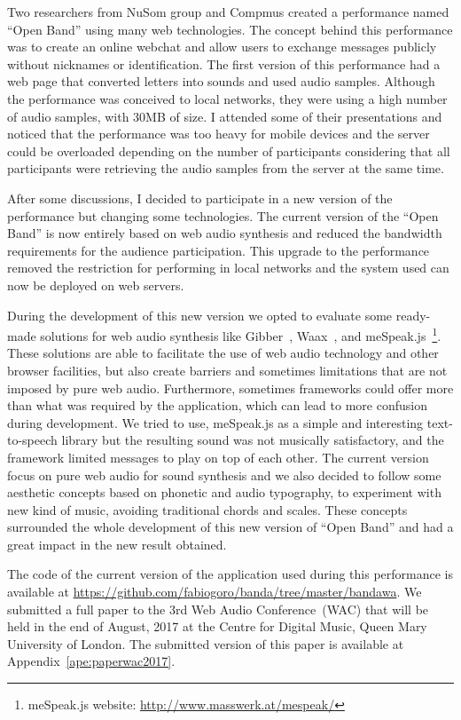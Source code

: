 Two researchers from NuSom group and Compmus created a performance named ``Open Band'' using many web technologies.
The concept behind this performance was to create an online webchat and allow users to exchange messages publicly without nicknames or identification.
The first version of this performance had a web page that converted letters into sounds and used audio samples.
Although the performance was conceived to local networks, they were using a high number of audio samples, with 30MB of size.
I attended some of their presentations and noticed that the performance was too heavy for mobile devices and the server could be overloaded depending on the number of participants considering that all participants were retrieving the audio samples from the server at the same time.

After some discussions, I decided to participate in a new version of the performance but changing some technologies.
The current version of the ``Open Band'' is now entirely based on web audio synthesis and reduced the bandwidth requirements for the audience participation.
This upgrade to the performance removed the restriction for performing in local networks and the system used can now be deployed on web servers.

During the development of this new version we opted to evaluate some ready-made solutions for web audio synthesis like Gibber~\citep{Roberts2012gibberlivecoding}, Waax~\citep{Choi2013waax}, and meSpeak.js~\footnote{meSpeak.js website: \url{http://www.masswerk.at/mespeak/}}.
These solutions are able to facilitate the use of web audio technology and other browser facilities, but also create barriers and sometimes limitations that are not imposed by pure web audio.
Furthermore, sometimes frameworks could offer more than what was required by the application, which can lead to more confusion during development. 
We tried to use, meSpeak.js as a simple and interesting text-to-speech library but the resulting sound was not musically satisfactory, and the framework limited messages to play on top of each other.
The current version focus on pure web audio for sound synthesis and we also decided to follow some aesthetic concepts based on phonetic and audio typography, to experiment with new kind of music, avoiding traditional chords and scales. 
These concepts surrounded the whole development of this new version of ``Open Band'' and had a great impact in the new result obtained.

The code of the current version of the application used during this performance is available at \url{https://github.com/fabiogoro/banda/tree/master/bandawa}.
We submitted a full paper to the 3rd Web Audio Conference~(WAC) that will be held in the end of August, 2017 at the Centre for Digital Music, Queen Mary University of London.
The submitted version of this paper is available at Appendix~\ref{ape:paperwac2017}.

